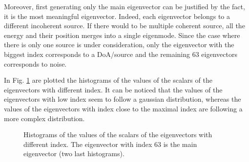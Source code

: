 \documentclass[11pt,a4paper,twoside]{report}
\begin{document}
Moreover, first generating only the main eigenvector can be justified by the fact, it is the most meaningful eigenvector. Indeed, each eigenvector belongs to a different incoherent source. If there would to be  multiple coherent source, all the energy and their position merges into a single eigenmode. Since the case where there is only one source is under consideration, only the eigenvector with the biggest index corresponds to a DoA/source and the remaining 63 eigenvectors corresponds to noise.  

In Fig. \ref{fig:histograms_eigenvectors} are plotted the histograms of the values of the scalars of the eigenvectors with different index. It can be noticed that the values of the eigenvectors with low index seem to follow a gaussian distribution, whereas the values of the eigenvectors with index close to the maximal index are following a more complex distribution.

\begin{figure}
    \centering
    \caption{Histograms of the values of the scalars of the eigenvectors with different index. The eigenvector with index $63$ is the main eigenvector (two last histograms).}
    \label{fig:histograms_eigenvectors}
\end{figure}
\end{document}
